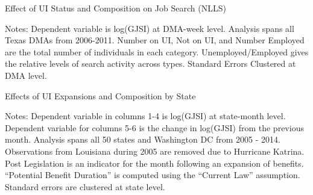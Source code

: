 \documentclass[12pt]{article}
\begin{document}
\begin{spacing}{2}
\begin{table}
\caption{Effect of UI Status and Composition on Job Search (NLLS)}\label{tab:nllscurlaw}
\begin{threeparttable}
\begin{center}

\begin{tablenotes}
\item  Notes: Dependent variable is log(GJSI) at DMA-week level. Analysis spans all Texas DMAs from 2006-2011. Number on UI, Not on UI, and Number Employed are the total number of individuals in each category. Unemployed/Employed gives the relative levels of search activity across types. Standard Errors Clustered at DMA level.
\end{tablenotes}
\end{center}
\end{threeparttable}
\end{table}

\begin{sidewaystable}
\caption{Effects of UI Expansions and Composition by State
\label{tab:nationalregs}}
\centering
\begin{threeparttable}

\begin{tablenotes}
\item  Notes: Dependent variable in columns 1-4 is log(GJSI) at state-month level. Dependent variable for columns 5-6 is the change in log(GJSI) from the previous month. Analysis spans all 50 states and Washington DC from 2005 - 2014. Observations from Louisiana during 2005 are removed due to Hurricane Katrina. Post Legislation is an indicator for the month following an expansion of benefits. ``Potential Benefit Duration'' is computed using the ``Current Law'' assumption. Standard errors are clustered at state level.
\end{tablenotes}
\end{threeparttable}
\end{sidewaystable}


\end{spacing}
\end{document}
